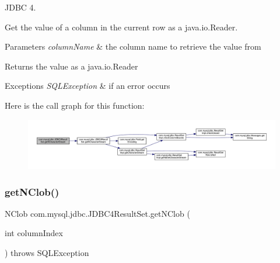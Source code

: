 J\+D\+BC 4.

Get the value of a column in the current row as a java.\+io.\+Reader. 


\begin{DoxyParams}{Parameters}
{\em column\+Name} & the column name to retrieve the value from\\
\hline
\end{DoxyParams}
\begin{DoxyReturn}{Returns}
the value as a java.\+io.\+Reader
\end{DoxyReturn}

\begin{DoxyExceptions}{Exceptions}
{\em S\+Q\+L\+Exception} & if an error occurs \\
\hline
\end{DoxyExceptions}
Here is the call graph for this function\+:
\nopagebreak
\begin{figure}[H]
\begin{center}
\leavevmode
\includegraphics[width=350pt]{classcom_1_1mysql_1_1jdbc_1_1_j_d_b_c4_result_set_a4477f8b894dc7e0892bb80064db7f499_cgraph}
\end{center}
\end{figure}
\mbox{\label{classcom_1_1mysql_1_1jdbc_1_1_j_d_b_c4_result_set_af604405c61bde640ee0b00aba57b81e1}} 
\subsubsection{\texorpdfstring{get\+N\+Clob()}{getNClob()}\hspace{0.1cm}{\footnotesize\ttfamily [1/2]}}
{\footnotesize\ttfamily N\+Clob com.\+mysql.\+jdbc.\+J\+D\+B\+C4\+Result\+Set.\+get\+N\+Clob (\begin{DoxyParamCaption}\item[{int}]{column\+Index }\end{DoxyParamCaption}) throws S\+Q\+L\+Exception}

